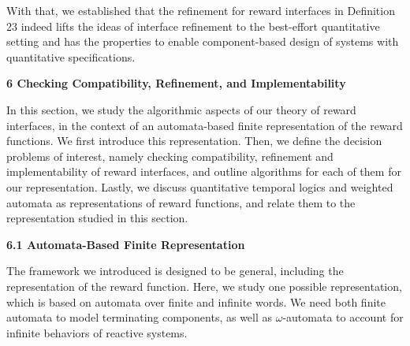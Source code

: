  
 
 
With that, we established that the refinement for reward interfaces in Definition 23 indeed lifts the ideas of interface refinement to the best-effort quantitative setting and has the properties to enable component-based design of systems with quantitative specifications.\par
 
 


 
\par\medskip\noindent\textbf{6 Checking Compatibility, Refinement, and Implementability}\par
 
 
In this section, we study the algorithmic aspects of our theory of reward interfaces, in the context of an automata-based finite representation of the reward functions. We first introduce this representation. Then, we define the decision problems of interest, namely checking compatibility, refinement and implementability of reward interfaces, and outline algorithms for each of them for our representation. Lastly, we discuss quantitative temporal logics and weighted automata as representations of reward functions, and relate them to the representation studied in this section.\par
 
 
 
\par\medskip\noindent\textbf{6.1 Automata-Based Finite Representation}\par
 
 
The framework we introduced is designed to be general, including the representation of the reward function. Here, we study one possible representation, which is based on automata over finite and infinite words. We need both finite automata to model terminating components, as well as $\omega$-automata to account for infinite behaviors of reactive systems.\par
 
 
 

